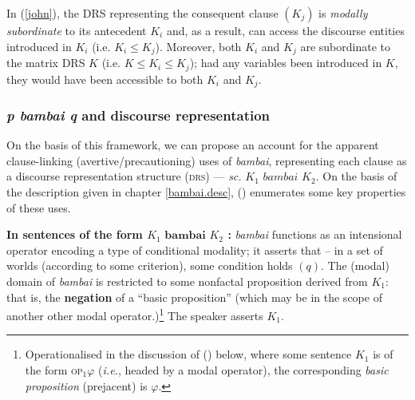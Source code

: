 \noindent In (\ref{john}), the DRS representing the consequent clause $ (K_j) $ is \textit{modally subordinate} to its antecedent $ K_i $ and, as a result, can access the discourse entities introduced in $ K_i $ (i.e. $ K_i\leqslant K_j $). Moreover, both $K_i$ and $K_j$ are subordinate to the matrix DRS $K$ (i.e. $ K\leqslant K_i\leqslant K_j $); had any variables been introduced in $K$, they would have been accessible to both $K_i$ and $K_j$. 

\subsubsection[Discourse representation of the precautioning construction]{\textit{\textbf{p} bambai \textbf{q}} and discourse representation}



On the basis of this framework, we can propose an account for the apparent clause-linking (avertive/precautioning) uses of \textit{bambai}, representing each clause as a discourse representation structure (\textsc{drs}) --- \textit{sc.} $ \mathit{K_1} \textit{ bambai } \mathit{K_2} $. On the basis of the description given in chapter \ref{bambai.desc}, (\nextx) enumerates some key properties of these uses.

\pex[labelformat=\bf\it A]\textbf{In sentences of the form $ \boldsymbol{\mathit{K_1} \textbf{ bambai }\mathit{K_2} } $ :}
\a \textit{bambai} functions as an intensional operator encoding a type of conditional modality; it asserts that -- in a set of worlds (according to some criterion), some condition holds $ (q) $. 
\a The (modal) domain of \textit{bambai} is restricted to some nonfactal proposition derived from $ \mathit{K_1}  $: that is, the \textbf{negation} of a ``basic proposition'' (which may be in the scope of another other modal operator.)\footnote{Operationalised in the discussion of () below, where some sentence $ \mathit{K_1} $ is of the form \textsc{op}$_1 \varphi $ (\textit{i.e.}, headed by a modal operator), the corresponding \textit{basic proposition} (prejacent) is $ \varphi $.} 
\a The speaker asserts $ \mathit{K_1} $.%
\xe


